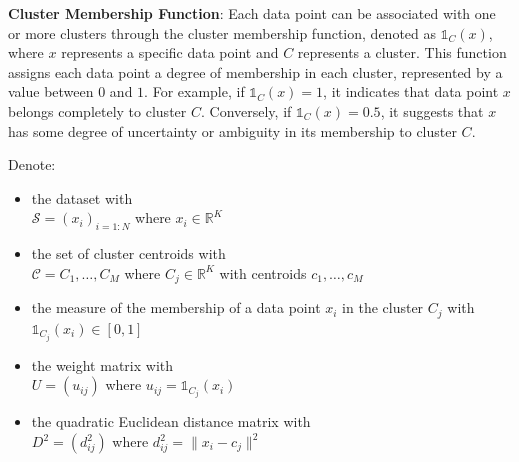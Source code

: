 \begin{modified}
\noindent \textbf{Cluster Membership Function}: Each data point can be associated with one or more clusters through the cluster membership function, denoted as $\mathds{1}_C(x)$, where $x$ represents a specific data point and $C$ represents a cluster. This function assigns each data point a degree of membership in each cluster, represented by a value between $0$ and $1$. For example, if $\mathds{1}_C(x) = 1$, it indicates that data point $x$ belongs completely to cluster $C$. Conversely, if $\mathds{1}_C(x) = 0.5$, it suggests that $x$ has some degree of uncertainty or ambiguity in its membership to cluster $C$.
\end{modified}
\begin{notation}
Denote:
\begin{itemize}
\item the dataset with \\ $\mathcal{S} = (x_i)_{i=1:N}$ where $x_i\in\mathbb{R}^K$
\item the set of cluster centroids with \\ $\mathcal{C}={C_1,\dots,C_M}$ where $C_j\in\mathbb{R}^K$ with centroids $c_1,\dots,c_M$
\item the measure of the membership of a data point $x_i$ in the cluster $C_j$ with \\ $\mathds{1}_{C_j}(x_i)\in\left[0,1\right]$
\item the weight matrix with \\ $U=(u_{ij})$ where $u_{ij}=\mathds{1}_{C_j}(x_i)$
\item the quadratic Euclidean distance matrix with \\ $D^2=(d^2_{ij})$ where $d_{ij}^2=\|x_i-c_j\|^2$
\end{itemize}
\end{notation}
\newpage
